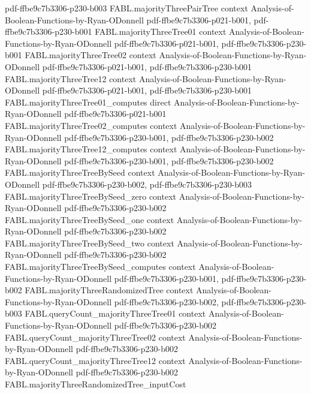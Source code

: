\begin{theorem}
  {pdf-ffbe9c7b3306-p230-b003}
\proofstep
  {FABL.majorityThreePairTree}
  {context}
  {Analysis-of-Boolean-Functions-by-Ryan-ODonnell}
  {pdf-ffbe9c7b3306-p021-b001,
    pdf-ffbe9c7b3306-p230-b001}
\proofstep
  {FABL.majorityThreeTree01}
  {context}
  {Analysis-of-Boolean-Functions-by-Ryan-ODonnell}
  {pdf-ffbe9c7b3306-p021-b001,
    pdf-ffbe9c7b3306-p230-b001}
\proofstep
  {FABL.majorityThreeTree02}
  {context}
  {Analysis-of-Boolean-Functions-by-Ryan-ODonnell}
  {pdf-ffbe9c7b3306-p021-b001,
    pdf-ffbe9c7b3306-p230-b001}
\proofstep
  {FABL.majorityThreeTree12}
  {context}
  {Analysis-of-Boolean-Functions-by-Ryan-ODonnell}
  {pdf-ffbe9c7b3306-p021-b001,
    pdf-ffbe9c7b3306-p230-b001}
\proofstep
  {FABL.majorityThreeTree01_computes}
  {direct}
  {Analysis-of-Boolean-Functions-by-Ryan-ODonnell}
  {pdf-ffbe9c7b3306-p021-b001}
\proofstep
  {FABL.majorityThreeTree02_computes}
  {context}
  {Analysis-of-Boolean-Functions-by-Ryan-ODonnell}
  {pdf-ffbe9c7b3306-p230-b001,
    pdf-ffbe9c7b3306-p230-b002}
\proofstep
  {FABL.majorityThreeTree12_computes}
  {context}
  {Analysis-of-Boolean-Functions-by-Ryan-ODonnell}
  {pdf-ffbe9c7b3306-p230-b001,
    pdf-ffbe9c7b3306-p230-b002}
\proofstep
  {FABL.majorityThreeTreeBySeed}
  {context}
  {Analysis-of-Boolean-Functions-by-Ryan-ODonnell}
  {pdf-ffbe9c7b3306-p230-b002,
    pdf-ffbe9c7b3306-p230-b003}
\proofstep
  {FABL.majorityThreeTreeBySeed_zero}
  {context}
  {Analysis-of-Boolean-Functions-by-Ryan-ODonnell}
  {pdf-ffbe9c7b3306-p230-b002}
\proofstep
  {FABL.majorityThreeTreeBySeed_one}
  {context}
  {Analysis-of-Boolean-Functions-by-Ryan-ODonnell}
  {pdf-ffbe9c7b3306-p230-b002}
\proofstep
  {FABL.majorityThreeTreeBySeed_two}
  {context}
  {Analysis-of-Boolean-Functions-by-Ryan-ODonnell}
  {pdf-ffbe9c7b3306-p230-b002}
\proofstep
  {FABL.majorityThreeTreeBySeed_computes}
  {context}
  {Analysis-of-Boolean-Functions-by-Ryan-ODonnell}
  {pdf-ffbe9c7b3306-p230-b001,
    pdf-ffbe9c7b3306-p230-b002}
\proofstep
  {FABL.majorityThreeRandomizedTree}
  {context}
  {Analysis-of-Boolean-Functions-by-Ryan-ODonnell}
  {pdf-ffbe9c7b3306-p230-b002,
    pdf-ffbe9c7b3306-p230-b003}
\proofstep
  {FABL.queryCount_majorityThreeTree01}
  {context}
  {Analysis-of-Boolean-Functions-by-Ryan-ODonnell}
  {pdf-ffbe9c7b3306-p230-b002}
\proofstep
  {FABL.queryCount_majorityThreeTree02}
  {context}
  {Analysis-of-Boolean-Functions-by-Ryan-ODonnell}
  {pdf-ffbe9c7b3306-p230-b002}
\proofstep
  {FABL.queryCount_majorityThreeTree12}
  {context}
  {Analysis-of-Boolean-Functions-by-Ryan-ODonnell}
  {pdf-ffbe9c7b3306-p230-b002}
\proofstep
  {FABL.majorityThreeRandomizedTree_inputCost}

\end{theorem}
